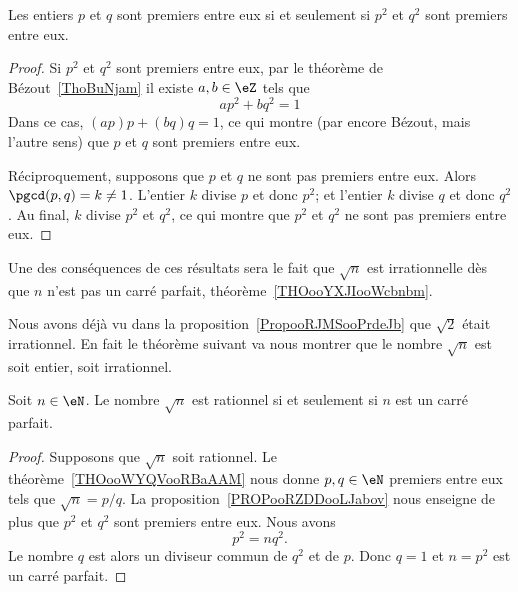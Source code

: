 \begin{proposition}     \label{PROPooRZDDooLJabov}
    Les entiers \( p\) et \( q\) sont premiers entre eux si et seulement si \( p^2\) et \( q^2\) sont premiers entre eux.
\end{proposition}

\begin{proof}
    Si \( p^2\) et \( q^2\) sont premiers entre eux, par le théorème de Bézout~\ref{ThoBuNjam} il existe \( a,b\in \eZ\) tels que
    \begin{equation}
        ap^2+bq^2=1
    \end{equation}
    Dans ce cas, \( (ap)p+(bq)q=1\), ce qui montre (par encore Bézout, mais l'autre sens) que \( p\) et \( q\) sont premiers entre eux.

    Réciproquement, supposons que \( p\) et \( q\) ne sont pas premiers entre eux. Alors \( \pgcd(p,q)=k\neq 1\). L'entier \( k\) divise \( p\) et donc \( p^2\); et l'entier \( k\) divise \( q\) et donc \( q^2\). Au final, \( k\) divise \( p^2\) et \( q^2\), ce qui montre que \( p^2\) et \( q^2\) ne sont pas premiers entre eux.
\end{proof}

Une des conséquences de ces résultats sera le fait que \( \sqrt{n}\) est irrationnelle dès que \( n\) n'est pas un carré parfait, théorème~\ref{THOooYXJIooWcbnbm}.

Nous avons déjà vu dans la proposition~\ref{PropooRJMSooPrdeJb} que \( \sqrt{2}\) était irrationnel. En fait le théorème suivant va nous montrer que le nombre \( \sqrt{ n }\) est soit entier, soit irrationnel.
\begin{theorem}     \label{THOooYXJIooWcbnbm}
    Soit \( n\in \eN\). Le nombre \( \sqrt{n}\) est rationnel si et seulement si \( n\) est un carré parfait.
\end{theorem}

\begin{proof}
    Supposons que \( \sqrt{n}\) soit rationnel. Le théorème~\ref{THOooWYQVooRBaAAM} nous donne \( p,q\in \eN\) premiers entre eux tels que \( \sqrt{n}=p/q\). La proposition~\ref{PROPooRZDDooLJabov} nous enseigne de plus que \( p^2\) et \( q^2\) sont premiers entre eux. Nous avons
    \begin{equation}
        p^2=nq^2.
    \end{equation}
    Le nombre $q$ est alors un diviseur commun de \( q^2\) et de \( p\). Donc \( q=1\) et \( n=p^2\) est un carré parfait.
\end{proof}

